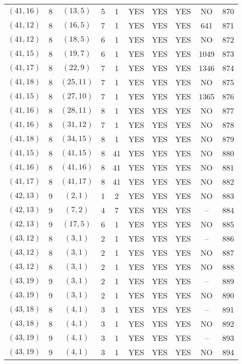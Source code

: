 \begin{longtable}{|c|c|c|c|c|c|c|c|c|c|}
$(41, 16)$ & 8 & $(13, 5)$ & 5 & 1 & YES & YES & YES & NO & 870\\
$(41, 12)$ & 8 & $(16, 5)$ & 7 & 1 & YES & YES & YES & 641 & 871\\
$(41, 12)$ & 8 & $(18, 5)$ & 6 & 1 & YES & YES & YES & NO & 872\\
$(41, 15)$ & 8 & $(19, 7)$ & 6 & 1 & YES & YES & YES & 1049 & 873\\
$(41, 17)$ & 8 & $(22, 9)$ & 7 & 1 & YES & YES & YES & 1346 & 874\\
$(41, 18)$ & 8 & $(25, 11)$ & 7 & 1 & YES & YES & YES & NO & 875\\
$(41, 15)$ & 8 & $(27, 10)$ & 7 & 1 & YES & YES & YES & 1365 & 876\\
$(41, 16)$ & 8 & $(28, 11)$ & 8 & 1 & YES & YES & YES & NO & 877\\
$(41, 16)$ & 8 & $(31, 12)$ & 7 & 1 & YES & YES & YES & NO & 878\\
$(41, 18)$ & 8 & $(34, 15)$ & 8 & 1 & YES & YES & YES & NO & 879\\
$(41, 15)$ & 8 & $(41, 15)$ & 8 & 41 & YES & YES & YES & NO & 880\\
$(41, 16)$ & 8 & $(41, 16)$ & 8 & 41 & YES & YES & YES & NO & 881\\
$(41, 17)$ & 8 & $(41, 17)$ & 8 & 41 & YES & YES & YES & NO & 882\\
$(42, 13)$ & 9 & $(2, 1)$ & 1 & 2 & YES & YES & YES & NO & 883\\
$(42, 13)$ & 9 & $(7, 2)$ & 4 & 7 & YES & YES & YES & -- & 884\\
$(42, 13)$ & 9 & $(17, 5)$ & 6 & 1 & YES & YES & YES & NO & 885\\
$(43, 12)$ & 8 & $(3, 1)$ & 2 & 1 & YES & YES & YES & -- & 886\\
$(43, 12)$ & 8 & $(3, 1)$ & 2 & 1 & YES & YES & YES & NO & 887\\
$(43, 12)$ & 8 & $(3, 1)$ & 2 & 1 & YES & YES & YES & NO & 888\\
$(43, 19)$ & 9 & $(3, 1)$ & 2 & 1 & YES & YES & YES & -- & 889\\
$(43, 19)$ & 9 & $(3, 1)$ & 2 & 1 & YES & YES & YES & NO & 890\\
$(43, 18)$ & 8 & $(4, 1)$ & 3 & 1 & YES & YES & YES & -- & 891\\
$(43, 18)$ & 8 & $(4, 1)$ & 3 & 1 & YES & YES & YES & NO & 892\\
$(43, 19)$ & 9 & $(4, 1)$ & 3 & 1 & YES & YES & YES & -- & 893\\
$(43, 19)$ & 9 & $(4, 1)$ & 3 & 1 & YES & YES & YES & NO & 894\\

\end{longtable}
